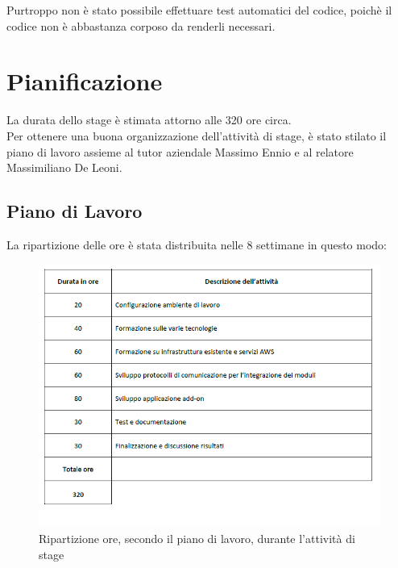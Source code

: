 Purtroppo non è stato possibile effettuare test automatici del codice, poichè il codice non è abbastanza corposo da renderli necessari.

\section{Pianificazione}
La durata dello stage è stimata attorno alle 320 ore circa.\\
Per ottenere una buona organizzazione dell'attività di stage, è stato stilato il piano di lavoro assieme al tutor aziendale Massimo Ennio e al relatore Massimiliano De Leoni.
\subsection{Piano di Lavoro}
La ripartizione delle ore è stata distribuita nelle 8 settimane in questo modo:
\begin{figure}[!h] 
	\centering 
	\includegraphics[scale = 0.8]{immagini/ripartizione-ore-piano.png} 
	\caption{Ripartizione ore, secondo il piano di lavoro, durante l'attività di stage}
\end{figure}

